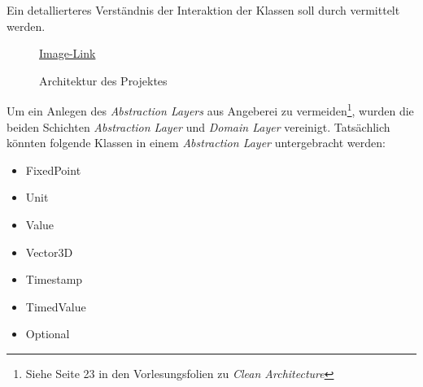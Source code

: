 Ein detallierteres Verständnis der Interaktion der Klassen soll durch  vermittelt werden.

\begin{figure}[ht!]
\vspace{0.25cm}
\begin{center}
\caption{Architektur des Projektes}
\label{fig:Arch}
\end{center}

\vspace{0.25cm}
\href{https://github.com/MaagMich/SWE2\_Project/blob/c5c3674bd201ee306463881cf711bb2ce9229842/Ausarbeitung/Pictures/Clean\%20Architecture.png}{Image-Link}
\end{figure}





Um ein Anlegen des \textit{Abstraction Layers} aus Angeberei zu vermeiden\footnote{Siehe Seite 23 in den Vorlesungsfolien zu \textit{Clean Architecture}}, wurden die beiden Schichten \textit{Abstraction Layer} und \textit{Domain Layer} vereinigt. Tatsächlich könnten folgende Klassen in einem \textit{Abstraction Layer} untergebracht werden:
\begin{itemize}
\item FixedPoint
\item Unit
\item Value
\item Vector3D
\item Timestamp
\item TimedValue 
\item Optional
\end{itemize}

